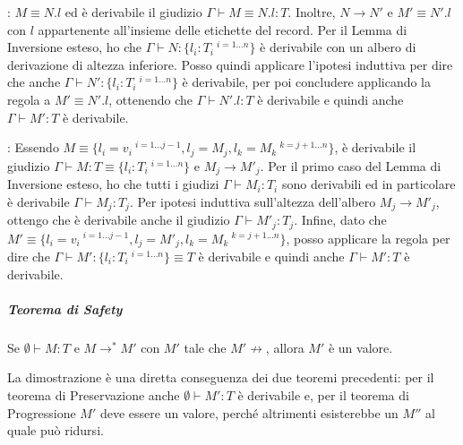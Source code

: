 \vspace{10px}

: $M \equiv N.l$ ed \`e derivabile il giudizio $\Gamma \vdash M \equiv N.l : T $. Inoltre, $ N \to N'$ e $M' \equiv N'.l$ con $l$ appartenente all'insieme delle etichette del record. 
Per il Lemma di Inversione esteso, ho che $\Gamma \vdash N : \{ l_i : T_i \:^{i = 1 \ldots n} \}$ \`e derivabile con un albero di derivazione di altezza inferiore.
Posso quindi applicare l'ipotesi induttiva per dire che anche $\Gamma \vdash N' : \{ l_i : T_i \:^{i = 1 \ldots n} \}$ \`e derivabile, per poi concludere applicando la regola  a $M' \equiv N'.l$, ottenendo che $\Gamma \vdash N'.l : T$ \`e derivabile e quindi anche $\Gamma \vdash M':T$ \`e derivabile.

\vspace{10px}

: Essendo $M \equiv \{ l_i = v_i \:^{i = 1 \ldots j-1}, l_j = M_j, l_k = M_k \:^{k = j+1\ldots n}\}$, \`e derivabile il giudizio $\Gamma \vdash M : T \equiv \{ l_i : T_i \:^{i = 1 \ldots n} \}$ e $M_j \to M'_j$.
Per il primo caso del Lemma di Inversione esteso, ho che tutti i giudizi $\Gamma \vdash M_i : T_i$ sono derivabili ed in particolare \`e derivabile $\Gamma \vdash M_j : T_j$.
Per ipotesi induttiva sull'altezza dell'albero $M_j \to M'_j$, ottengo che \`e derivabile anche il giudizio $\Gamma \vdash M'_j : T_j$.
Infine, dato che $M' \equiv \{ l_i = v_i \:^{i = 1 \ldots j-1}, l_j = M'_j, l_k = M_k \:^{k = j+1\ldots n}\}$, posso applicare la regola  per dire che  $\Gamma \vdash M' : \{ l_i : T_i \:^{i = 1 \ldots n} \} \equiv T$ \`e derivabile e quindi anche $\Gamma \vdash M' : T$ \`e derivabile.

\subparagraph{Teorema di Safety}

\begin{centering}
	Se $\emptyset \vdash M :T$ e $M \to^* M'$ con $M'$ tale che $M' \not\to$, allora $M'$ \`e un valore.
\end{centering}

\noindent La dimostrazione \`e una diretta conseguenza dei due teoremi precedenti: per il teorema di Preservazione anche $\emptyset \vdash M': T$ \`e derivabile e, per il teorema di Progressione $M'$ deve essere un valore, perch\'e altrimenti esisterebbe un $M''$ al quale pu\`o ridursi.


	